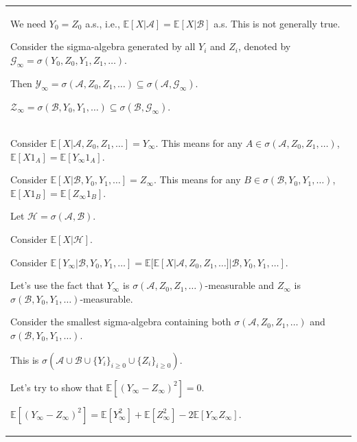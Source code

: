 \documentclass{article}
\theoremstyle{plain}
\theoremstyle{definition}
\theoremstyle{remark}
\newcommand{\defaultlightblue}[1]{{\leavevmode\color{bluec}#1}}
\begin{document}
\begin{longtable}{@{}p{\textwidth}@{}}
{We need \( Y_0 = Z_0 \) a.s., i.e., \( \mathbb{E}[X|\mathcal{A}] = \mathbb{E}[X|\mathcal{B}] \) a.s. This is not generally true.


Consider the sigma-algebra generated by all \(Y_i\) and \(Z_i\), denoted by \( \mathcal{G}_\infty = \sigma(Y_0, Z_0, Y_1, Z_1, \ldots) \).

Then \( \mathcal{Y}_\infty = \sigma(\mathcal{A}, Z_0, Z_1, \ldots) \subseteq \sigma(\mathcal{A}, \mathcal{G}_\infty) \).

\( \mathcal{Z}_\infty = \sigma(\mathcal{B}, Y_0, Y_1, \ldots) \subseteq \sigma(\mathcal{B}, \mathcal{G}_\infty) \).

}
\\
\defaultlightblue{

Consider \( \mathbb{E}[X|\mathcal{A}, Z_0, Z_1, \ldots] = Y_\infty \). This means for any \( A \in \sigma(\mathcal{A}, Z_0, Z_1, \ldots) \), \( \mathbb{E}[X 1_A] = \mathbb{E}[Y_\infty 1_A] \).

Consider \( \mathbb{E}[X|\mathcal{B}, Y_0, Y_1, \ldots] = Z_\infty \). This means for any \( B \in \sigma(\mathcal{B}, Y_0, Y_1, \ldots) \), \( \mathbb{E}[X 1_B] = \mathbb{E}[Z_\infty 1_B] \).



Let \( \mathcal{H} = \sigma(\mathcal{A}, \mathcal{B}) \).

Consider \( \mathbb{E}[X|\mathcal{H}] \).



Consider \( \mathbb{E}[Y_\infty|\mathcal{B}, Y_0, Y_1, \ldots] = \mathbb{E}[\mathbb{E}[X|\mathcal{A}, Z_0, Z_1, \ldots]|\mathcal{B}, Y_0, Y_1, \ldots] \).



Let's use the fact that \( Y_\infty \) is \( \sigma(\mathcal{A}, Z_0, Z_1, \ldots) \)-measurable and \( Z_\infty \) is \( \sigma(\mathcal{B}, Y_0, Y_1, \ldots) \)-measurable.



Consider the smallest sigma-algebra containing both \( \sigma(\mathcal{A}, Z_0, Z_1, \ldots) \) and \( \sigma(\mathcal{B}, Y_0, Y_1, \ldots) \).

This is \( \sigma(\mathcal{A} \cup \mathcal{B} \cup \{Y_i\}_{i \ge 0} \cup \{Z_i\}_{i \ge 0}) \).



Let's try to show that \( \mathbb{E}[(Y_\infty - Z_\infty)^2] = 0 \).

\( \mathbb{E}[(Y_\infty - Z_\infty)^2] = \mathbb{E}[Y_\infty^2] + \mathbb{E}[Z_\infty^2] - 2 \mathbb{E}[Y_\infty Z_\infty] \).



}
\end{longtable}
\end{document}
